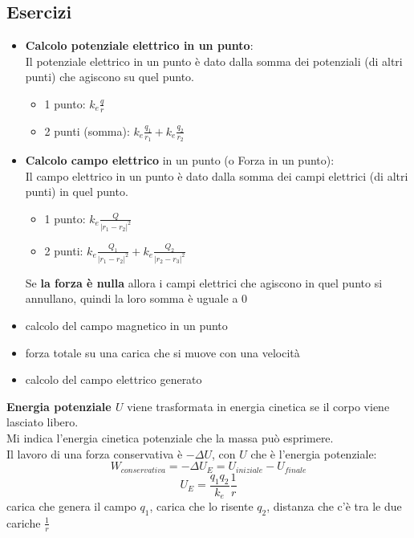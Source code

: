 \documentclass{article}
\begin{document}
\subsection{Esercizi}
\begin{itemize}
  \item \textbf{Calcolo potenziale elettrico in un punto}:
      \\Il potenziale elettrico in un punto è dato dalla somma dei potenziali (di altri punti) che agiscono su quel punto.
      \begin{itemize}
          \item 1 punto: $k_e\frac{q}{r}$
          \item 2 punti (somma): $k_e\frac{q_1}{r_1}+k_e\frac{q_2}{r_2}$
      \end{itemize}
  
  \item \textbf{Calcolo campo elettrico} in un punto (o Forza in un punto):\\
  Il campo elettrico in un punto è dato dalla somma dei campi elettrici (di altri punti) in quel punto.
      \begin{itemize}
          \item 1 punto: $k_e\frac{Q}{|r_1-r_2|^2}$
          \item 2 punti: $k_e\frac{Q_1}{|r_1-r_2|^2}+k_e\frac{Q_2}{|r_2-r_3|^2}$
      \end{itemize}
    
      Se \textbf{la forza è nulla} allora i campi elettrici che agiscono in quel punto si annullano, quindi la loro somma è uguale a $0$
  \item calcolo del campo magnetico in un punto
  \item forza totale su una carica che si muove con una velocità
  \item calcolo del campo elettrico generato 
  
  \end{itemize}
\textbf{Energia potenziale $U$} viene trasformata in energia cinetica se il corpo viene lasciato libero.\\
Mi indica l'energia cinetica potenziale che la massa può esprimere.\\
Il lavoro di una forza conservativa è $-\Delta U$, con $U$ che è l'energia potenziale:
\begin{equation*}
  W_{conservativa}=-\Delta U_E=U_{iniziale}-U_{finale}
\end{equation*}
\begin{equation*}
  U_E=\frac{q_1q_2}{k_e}\frac{1}{r}
\end{equation*} carica che genera il campo $q_1$, carica che lo risente $q_2$, distanza che c'è tra le due cariche $\frac{1}{r}$
\end{document}
